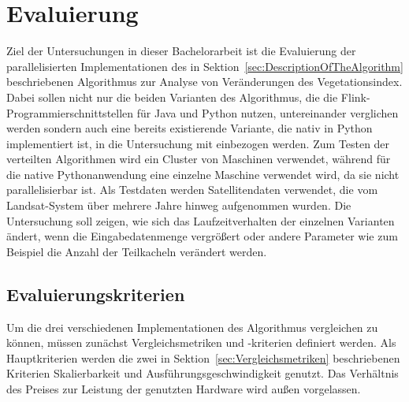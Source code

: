 
\chapter{Evaluierung}
Ziel der Untersuchungen in dieser Bachelorarbeit ist die Evaluierung der parallelisierten Implementationen des in Sektion~\ref{sec:DescriptionOfTheAlgorithm} beschriebenen Algorithmus zur Analyse von Veränderungen des Vegetationsindex. Dabei sollen nicht nur die beiden Varianten des Algorithmus, die die Flink-Programmierschnittstellen für Java und Python nutzen, untereinander verglichen werden sondern auch eine bereits existierende Variante, die nativ in Python implementiert ist, in die Untersuchung mit einbezogen werden. Zum Testen der verteilten Algorithmen wird ein Cluster von Maschinen verwendet, während für die native Pythonanwendung eine einzelne Maschine verwendet wird, da sie nicht parallelisierbar ist. Als Testdaten werden Satellitendaten verwendet, die vom Landsat-System über mehrere Jahre hinweg aufgenommen wurden. Die Untersuchung soll zeigen, wie sich das Laufzeitverhalten der einzelnen Varianten ändert, wenn die Eingabedatenmenge vergrößert oder andere Parameter wie zum Beispiel die Anzahl der Teilkacheln verändert werden.

\section{Evaluierungskriterien}
\label{sec:evaluationCriteria}
Um die drei verschiedenen Implementationen des Algorithmus vergleichen zu können, müssen zunächst Vergleichsmetriken und -kriterien definiert werden. Als Hauptkriterien werden die zwei in Sektion~\ref{sec:Vergleichsmetriken} beschriebenen Kriterien Skalierbarkeit und Ausführungsgeschwindigkeit genutzt. Das Verhältnis des Preises zur Leistung der genutzten Hardware wird außen vorgelassen. 


